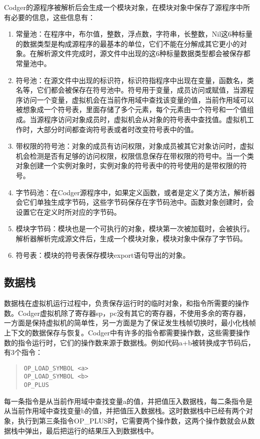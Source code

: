 \documentclass[a4paper,10pt]{article}
\begin{document}
\begin{CJK}{UTF8}{gbsn}
Codger的源程序被解析后会生成一个模块对象，在模块对象中保存了源程序中所有必要的信息，这些信息有：
\begin{enumerate}
\item 常量池：在程序中，布尔值，整数，浮点数，字符串，长整数，Nil这6种标量的数据类型是构成源程序的最基本的单位，它们不能在分解成其它更小的对象。在解析源文件完成时，源文件中出现的这6种标量数据类型都会被保存都常量池中。
\item 符号池：在源文件中出现的标识符，标识符指程序中出现在变量，函数名，类名等，它们都会被保存在符号池中。符号用于变量，成员访问或赋值，当源程序访问一个变量，虚拟机会在当前作用域中查找该变量的值，当前作用域可以被想象成一个符号表，里面存储了多个元素，每个元素由一个符号和一个值组成。当源程序访问对象成员时，虚拟机会从对象的符号表中查找值。虚拟机工作时，大部分时间都查询符号表或者时改变符号表中的值。
\item 带权限的符号池：对象的成员有访问权限，对象成员被其它对象访问时，虚拟机会检测是否有足够的访问权限，权限信息保存在带权限的符号中。当一个类对象创建一个实例对象时，实例对象的符号表中的符号使用的是带权限的符号。
\item 字节码池：在Codger源程序中，如果定义函数，或者是定义了类方法，解析器会它们单独生成字节码，这些字节码保存在字节码池中。函数对象创建时，会设置它在定义时所对应的字节码。
\item 模块字节码：模块也是一个可执行的对象，模块第一次被加载时，会被执行。解析器解析完成源文件后，生成一个模块对象，模块对象中保存了字节码。
\item 符号表：模块的符号表保存模块export语句导出的对象。
\end{enumerate}
\subsection{数据栈}
数据栈在虚拟机运行过程中，负责保存运行时的临时对象，和指令所需要的操作数。Codger虚拟机除了寄存器sp，pc没有其它的寄存器，不使用多余的寄存器，一方面是保持虚拟机的简单性，另一方面是为了保证发生栈帧切换时，最小化栈帧上下文的数据保存与恢复。Codger中有许多的指令都需要操作数，这些需要操作数的指令运行时，它们的操作数来源于数据栈。例如代码a+b被转换成字节码后，有3个指令：
\begin{quote}
\begin{verbatim}
OP_LOAD_SYMBOL <a>
OP_LOAD_SYMBOL <b>
OP_PLUS
\end{verbatim}
\end{quote}
每一条指令是从当前作用域中查找变量a的值，并把值压入数据栈，每二条指令是从当前作用域中查找变量b的值，并把值压入数据栈。这时数据栈中已经有两个对象，执行到第三条指令OP\_PLUS时，它需要两个操作数，这两个操作数就会从数据栈中弹出，最后把运行的结果压入到数据栈中。

\end{CJK}
\end{document}

